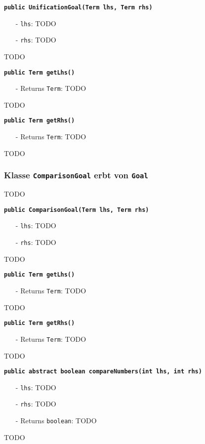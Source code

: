 \documentclass[parskip=full,11pt,twoside]{scrartcl}
\begin{document}
\textbf{\texttt{public UnificationGoal(Term lhs, Term rhs)}}
\begin{itemize}[noitemsep]
	\item[-] \texttt{lhs}: TODO
	\item[-] \texttt{rhs}: TODO
\end{itemize}
TODO

\textbf{\texttt{public Term getLhs()}}
\begin{itemize}[noitemsep]
	\item[-] Returns \texttt{Term}: TODO
\end{itemize}
TODO

\textbf{\texttt{public Term getRhs()}}
\begin{itemize}[noitemsep]
	\item[-] Returns \texttt{Term}: TODO
\end{itemize}
TODO

\subsubsection{Klasse \texttt{ComparisonGoal} erbt von \texttt{Goal}}
TODO

\textbf{\texttt{public ComparisonGoal(Term lhs, Term rhs)}}
\begin{itemize}[noitemsep]
	\item[-] \texttt{lhs}: TODO
	\item[-] \texttt{rhs}: TODO
\end{itemize}
TODO

\textbf{\texttt{public Term getLhs()}}
\begin{itemize}[noitemsep]
	\item[-] Returns \texttt{Term}: TODO
\end{itemize}
TODO

\textbf{\texttt{public Term getRhs()}}
\begin{itemize}[noitemsep]
	\item[-] Returns \texttt{Term}: TODO
\end{itemize}
TODO

\textbf{\texttt{public abstract boolean compareNumbers(int lhs, int rhs)}}
\begin{itemize}[noitemsep]
	\item[-] \texttt{lhs}: TODO
	\item[-] \texttt{rhs}: TODO
	\item[-] Returns \texttt{boolean}: TODO
\end{itemize}
TODO
\end{document}
